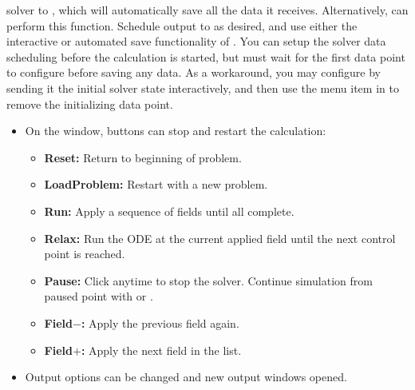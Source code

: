 \begin{list}{}{\setlength{\labelwidth}{0pt}
               \setlength{\leftmargin}{0pt}
               \setlength{\rightmargin}{\leftmargin}
               \setlength{\itemsep}{0pt}}
\begin{description}
\begin{itemize}
            solver to ,
            which will automatically save all the data it receives.
            Alternatively, 
            can perform this function.  Schedule output to
             as desired, and use either the
            interactive or automated save functionality of
            .  You can setup the solver data
            scheduling before the calculation is started, but must wait
            for the first data point to configure  before
            saving any data.  As a workaround, you may configure
             by sending it the initial solver state
            interactively, and then use the {} menu item in  to remove the
            initializing data point.
    \end{itemize}
    \item[Midcourse control:]\blankspace
    \begin{itemize}
      \item On the  window, buttons can stop and restart the
            calculation:
      \begin{itemize}
        \item {\bf Reset:}  Return to beginning of problem.
        \item {\bf LoadProblem:} Restart with a new problem.
        \item {\bf Run:}    Apply a sequence of fields until all complete.
        \item {\bf Relax:}  Run the ODE at the current applied field until
            the next control point is reached.
        \item {\bf Pause:}  Click anytime to stop the solver.  Continue
            simulation from paused point with  or .
        \item {\bf\boldmath Field$-$:} Apply the previous field again.
        \item {\bf\boldmath Field$+$:} Apply the next field in the list.
      \end{itemize}
      \item Output options can be changed and new output windows opened.
    \end{itemize}
  \end{description}
  \item {}

\end{list}

